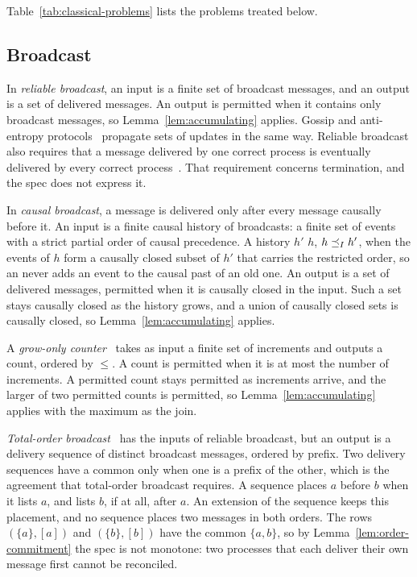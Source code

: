 Table~\ref{tab:classical-problems} lists the problems treated below.

\subsection{Broadcast}
\label{app:broadcast}

In \emph{reliable broadcast}, an input is a finite set of broadcast messages,
and an output is a set of delivered messages.  An output is permitted when it
contains only broadcast messages, so Lemma~\ref{lem:accumulating} applies.
Gossip and anti-entropy protocols~\cite{demers1987epidemic} propagate sets of
updates in the same way.  Reliable broadcast also requires that a message
delivered by one correct process is eventually delivered by every correct
process~\cite{hadzilacos1994modular}.  That requirement concerns termination,
and the spec does not express it.

In \emph{causal broadcast}, a message is delivered only after every message
causally before it.  An input is a finite causal history of broadcasts: a
finite set of events with a strict partial order of causal precedence.  A
history $h'$ \inrel $h$, $h\preceq_I h'$, when the events of $h$ form a
causally closed subset of $h'$ that carries the restricted order, so an
\indesc never adds an event to the causal past of an old one.  An output is a
set of delivered messages, permitted when it is causally closed in the input.
Such a set stays causally closed as the history grows, and a union of causally
closed sets is causally closed, so Lemma~\ref{lem:accumulating} applies.

A \emph{grow-only counter}~\cite{shapiro2011crdt} takes as input a finite set
of increments and outputs a count, ordered by $\leq$.  A count is permitted
when it is at most the number of increments.  A permitted count stays
permitted as increments arrive, and the larger of two permitted counts is
permitted, so Lemma~\ref{lem:accumulating} applies with the maximum as the join.

\emph{Total-order broadcast}~\cite{defago2004total} has the inputs of reliable
broadcast, but an output is a delivery sequence of distinct broadcast
messages, ordered by prefix.  Two delivery sequences have a common \outnoun
only when one is a prefix of the other, which is the agreement that
total-order broadcast requires.  A sequence places $a$ before $b$ when it lists
$a$, and lists $b$, if at all, after $a$.  An extension of the sequence keeps
this placement, and no sequence places two messages in both orders.  The rows
$(\{a\},[a])$ and $(\{b\},[b])$ have the common \indesc $\{a,b\}$, so by
Lemma~\ref{lem:order-commitment} the spec is not monotone: two processes that
each deliver their own message first cannot be reconciled.

